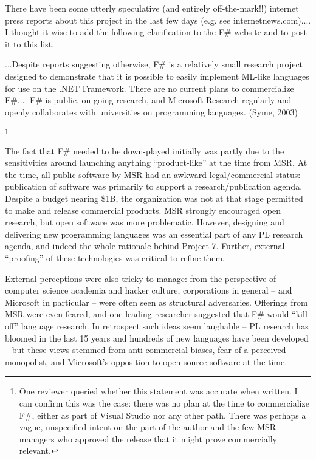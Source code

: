 \documentclass[acmsmall,review]{acmart}\settopmatter{printfolios=true,printccs=false,printacmref=false}
\begin{document}
\begin{verbquote}
There have been some utterly speculative (and entirely off-the-mark!!) internet press reports about this project in the last few days (e.g. see internetnews.com).... I thought it wise to add the following clarification to the F\# website and to post it to this list.

...Despite reports suggesting otherwise, F\# is a relatively small research project designed to demonstrate that it is possible to easily implement ML-like languages for use on the .NET Framework.  There are no current plans to commercialize F\#.... F\# is public, on-going research, and Microsoft Research regularly and openly collaborates with universities on programming languages. (Syme, 2003)  
\end{verbquote}\footnote{One reviewer queried whether this statement was accurate when written.  I can confirm this was the case: there was no plan at the time to commercialize F\#, either as part of Visual Studio nor any other path. There was perhaps a vague, unspecified intent on the part of the author and the few MSR managers who approved the release that it might prove commercially relevant.}

The fact that F\# needed to be down-played initially was partly due to the sensitivities around launching anything “product-like” at the time from MSR. At the time, all public software by MSR had an awkward legal/commercial status: publication of software was primarily to support a research/publication agenda. Despite a budget nearing \$1B, the organization was not at that stage permitted to make and release commercial products.  MSR strongly encouraged open research, but open software was more problematic. However, designing and delivering new programming languages was an essential part of any PL research agenda, and indeed the whole rationale behind Project 7.  Further, external “proofing” of these technologies was critical to refine them. 

External perceptions were also tricky to manage: from the perspective of computer science academia and hacker culture, corporations in general – and Microsoft in particular – were often seen as structural adversaries. Offerings from MSR were even feared, and one leading researcher suggested that F\# would “kill off” language research.  In retrospect such ideas seem laughable – PL research has bloomed in the last 15 years and hundreds of new languages have been developed – but these views stemmed from anti-commercial biases, fear of a perceived monopolist, and Microsoft’s opposition to open source software at the time. 
\end{document}
